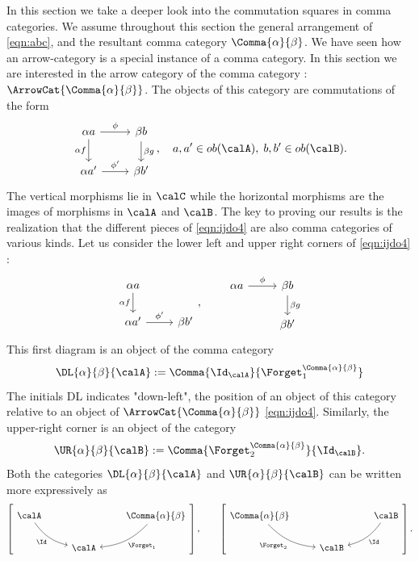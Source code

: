\documentclass[12pt,oneside]{article}
\begin{document}
In this section we take a deeper look into the commutation squares in comma categories. We assume throughout this section the general arrangement of \eqref{eqn:abc}, and the resultant comma category $\Comma{\alpha}{\beta}$. We have seen how an arrow-category is a special instance of a comma category. In this section we are interested in the arrow category of the comma category : $\ArrowCat{ \Comma{\alpha}{\beta} }$. The objects of this category are commutations of the form
%
\begin{equation} \label{eqn:ijdo4}
	\begin{tikzcd}
		\alpha a \arrow[r, "\phi"] \arrow[d, "\alpha f"'] & \beta b \arrow[d, "\beta g"] \\
		\alpha a' \arrow[r, "\phi'"] & \beta b' 
	\end{tikzcd}, \quad a,a' \in ob(\calA) , \; b, b' \in ob(\calB) .
\end{equation}
%
The vertical morphisms lie in $\calC$ while the horizontal morphisms are the images of morphisms in $\calA$ and $\calB$. The key to proving our results is the realization that the different pieces of \eqref{eqn:ijdo4} are also comma categories of various kinds. Let us consider the lower left and upper right corners of \eqref{eqn:ijdo4} :
%
\[\begin{tikzcd} \alpha a \arrow[d, "\alpha f"'] \\ \alpha a' \arrow[r, "\phi'"] & \beta b' \end{tikzcd} , \quad \quad 
\begin{tikzcd} \alpha a \arrow[r, "\phi"] & \beta b \arrow[d, "\beta g"] \\ & \beta b' \end{tikzcd}\]
%
This first diagram is an object of the comma category 
%
\[ \DL{\alpha}{\beta}{\calA} := \Comma{ \Id_{\calA} }{ \Forget_1^{ \Comma{\alpha}{\beta} } } \]
%
The initials DL indicates "down-left", the position of an object of this category relative to an object of $\ArrowCat{ \Comma{\alpha}{\beta} }$ \eqref{eqn:ijdo4}. Similarly, the upper-right corner is an object of the category
%
\[ \UR{\alpha}{\beta}{\calB} := \Comma{ \Forget_2^{ \Comma{\alpha}{\beta} } }{ \Id_{\calB} } . \]
%
Both the categories $\DL{\alpha}{\beta}{\calA}$ and $\UR{\alpha}{\beta}{\calB}$ can be written more expressively as
%
\[\left[ \begin{tikzcd} \calA \arrow[bend right=20]{dr}[swap]{\Id} & & \Comma{\alpha}{\beta} \arrow[bend left=20]{dl}{\Forget_1} \\ & \calA \end{tikzcd}\right] , \quad \quad \left[ \begin{tikzcd} \Comma{\alpha}{\beta} \arrow[bend right=20]{dr}[swap]{\Forget_2} & & \calB \arrow[bend left=20]{dl}{\Id} \\ & \calB \end{tikzcd}\right] . \]
\end{document}

